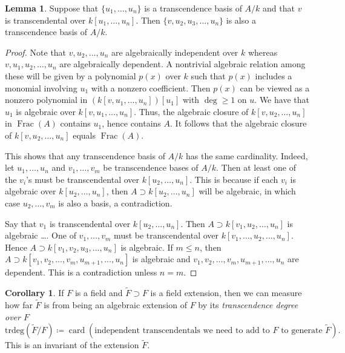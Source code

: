 \documentclass[10pt,letterpaper,cm]{nupset}
\theoremstyle{definition}
\theoremstyle{theorem}
\newtheorem{lemma}[definition]{Lemma}
\newtheorem{corollary}[definition]{Corollary}
\theoremstyle{remark}
\newcommand{\1}{\mathbf{1}}
\newcommand{\0}{\vec 0}
\DeclareMathOperator{\card}{\text{card}}
\DeclareMathOperator{\Frac}{Frac}
\begin{document}
\begin{lemma}
Suppose that $\{u_1, \ldots, u_n\}$ is a transcendence basis of $A/k$ and that $v$ is transcendental over $k[u_1, \ldots, u_n]$. Then $\{ v, u_2, u_3, \ldots, u_n \}$ is also a transcendence basis of $A/k$.
\end{lemma}
\begin{proof}
Note that $v, u_2, \ldots, u_n$ are algebraically independent over $k$ whereas $v, u_1, u_2, \ldots, u_n$ are algebraically dependent. A nontrivial algebraic relation among these will be given by a polynomial $p(x)$ over $k$ such that $p(x)$ includes a monomial involving $u_1$ with a nonzero coefficient. Then $p(x)$ can be viewed as a nonzero polynomial in $(k[v, u_1, \ldots, u_n])[u_1]$ with $\deg \geq 1$ on $u$. We have that $u_1$ is algebraic over $k[v, u_1, \ldots, u_n]$. Thus, the algebraic closure of $k[v, u_2, \ldots, u_n]$ in $\Frac(A)$ contains $u_1$, hence contains $A$. It follows that the algebraic closure of $k[v, u_2, \ldots, u_n]$ equals $\Frac(A)$.

\medskip


This shows that any transcendence basis of $A / k$ has the same cardinality. Indeed, let $u_1, \ldots, u_n$ and $v_1, \ldots, v_m$ be transcendence bases of $A/k$. Then at least one of the $v_i$'s must be transcendental over $k[u_2, \ldots, u_n]$. This is because if each $v_i$ is algebraic over $k[u_2, \ldots, u_n]$, then $A \supset k[u_2, \ldots, u_n]$ will be algebraic, in which case $u_2, \ldots, v_m$ is also a basis, a contradiction. 

\medskip


Say that $v_1$ is transcendental over $k[u_2, \ldots, u_n]$. Then $A \supset k[v_1, u_2, \ldots, u_n]$ is algebraic \ldots . One of $v_1, \ldots, v_m$ must be transcendental over $k[v_1, \ldots, u_2, \ldots, u_n]$. Hence $A \supset k[v_1, v_2, u_3, \ldots, u_n]$ is algebraic. If $m \leq n$, then $A \supset k[v_1, v_2, \ldots, v_m, u_{m+1}, \ldots, u_n]$ is algebraic and $v_1, v_2, \ldots, v_m, u_{m+1}, \ldots, u_n$ are dependent. This is a contradiction unless $n=m$. 
\end{proof}

\begin{corollary}
If $F$ is a field and $\widetilde{F}\supset F$ is a field extension, then we can measure how far $\widetilde{F}$ is from being an algebraic extension of $F$ by its \textit{transcendence degree over $F$} $$\text{trdeg}\left(\widetilde{F}/F\right) \coloneqq  \card(\text{independent transcendentals we need to add to } F \text{ to generate } \widetilde{F}).$$ This is an invariant of the extension $\widetilde{F}$.
\end{corollary}
\end{document}
